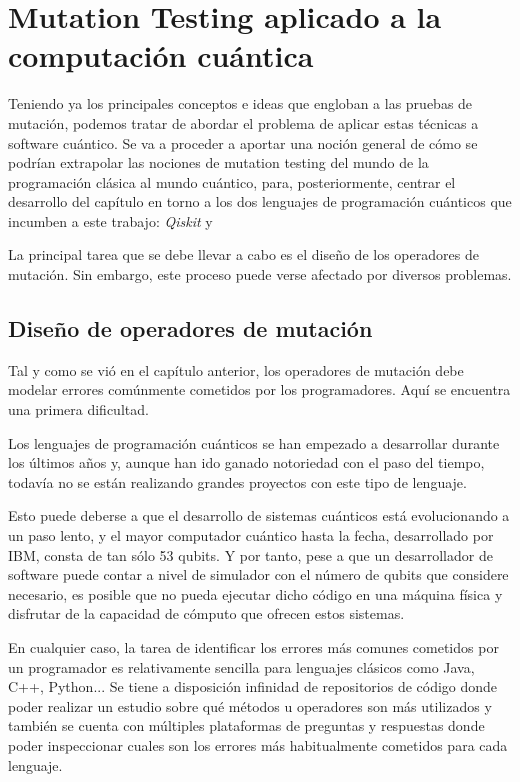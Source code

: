 	
\chapter[Mutation Testing en computación cuántica]{Mutation Testing aplicado a la computación cuántica}

Teniendo ya los principales conceptos e ideas que engloban a las pruebas de mutación, podemos tratar de abordar el problema de aplicar estas técnicas a software cuántico. Se va a proceder a aportar una noción general de cómo se podrían extrapolar las nociones de mutation testing del mundo de la programación clásica al mundo cuántico, para, posteriormente, centrar el desarrollo del capítulo en torno a los dos lenguajes de programación cuánticos que incumben a este trabajo: \textit{Qiskit} y \qsh

La principal tarea que se debe llevar a cabo es el diseño de los operadores de mutación. Sin embargo, este proceso puede verse afectado por diversos problemas.

\section{Diseño de operadores de mutación}

Tal y como se vió en el capítulo anterior, los operadores de mutación debe modelar errores comúnmente cometidos por los programadores. Aquí se encuentra una primera dificultad.

Los lenguajes de programación cuánticos se han empezado a desarrollar durante los últimos años y, aunque han ido ganado notoriedad con el paso del tiempo, todavía no se están realizando grandes proyectos con este tipo de lenguaje. 

Esto puede deberse a que el desarrollo de sistemas cuánticos está evolucionando a un paso lento, y el mayor computador cuántico hasta la fecha, desarrollado por IBM, consta de tan sólo 53 qubits. Y por tanto, pese a que un desarrollador de software puede contar a nivel de simulador con el número de qubits que considere necesario, es posible que no pueda ejecutar dicho código en una máquina física y disfrutar de la capacidad de cómputo que ofrecen estos sistemas.

En cualquier caso, la tarea de identificar los errores más comunes cometidos por un programador es relativamente sencilla para lenguajes clásicos como Java, C++, Python... Se tiene a disposición infinidad de repositorios de código donde poder realizar un estudio sobre qué métodos u operadores son más utilizados y también se cuenta con múltiples plataformas de preguntas y respuestas donde poder inspeccionar cuales son los errores más habitualmente cometidos para cada lenguaje. 

